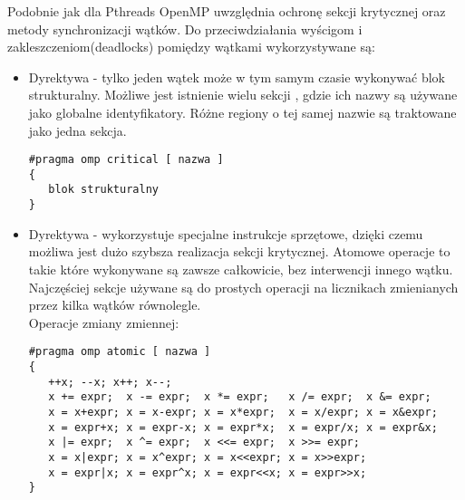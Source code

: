\documentclass[document.tex]{subfiles}
\begin{document}
\indent Podobnie jak dla Pthreads OpenMP uwzględnia ochronę sekcji krytycznej 
oraz metody synchronizacji wątków. Do przeciwdziałania wyścigom i zakleszczeniom(deadlocks) pomiędzy wątkami wykorzystywane są:\cite{openmp_spec}\cite{openmp_guide}
\begin{itemize}
\item Dyrektywa  - tylko jeden wątek może w tym samym czasie wykonywać blok strukturalny. Możliwe jest istnienie wielu sekcji , gdzie ich nazwy 
są używane jako globalne identyfikatory. Różne regiony  o tej samej
nazwie są traktowane jako jedna sekcja.\cite{openmp_pacheco}\cite{openmp_blaise} 
\begin{verbatim}
#pragma omp critical [ nazwa ]
{
   blok strukturalny
}
\end{verbatim}

\item Dyrektywa  - wykorzystuje specjalne instrukcje sprzętowe, dzięki
czemu możliwa jest dużo szybsza realizacja sekcji krytycznej. Atomowe operacje to
takie które wykonywane są zawsze całkowicie, bez interwencji innego wątku.
Najczęściej sekcje  używane są do prostych operacji na licznikach
zmienianych przez kilka wątków równolegle.\cite{openmp_guide}\cite{openmp_spec}
\\
Operacje zmiany zmiennej:
\begin{verbatim}
#pragma omp atomic [ nazwa ]
{
   ++x; --x; x++; x--;
   x += expr;  x -= expr;  x *= expr;   x /= expr;  x &= expr;
   x = x+expr; x = x-expr; x = x*expr;  x = x/expr; x = x&expr;
   x = expr+x; x = expr-x; x = expr*x;  x = expr/x; x = expr&x;
   x |= expr;  x ^= expr;  x <<= expr;  x >>= expr;
   x = x|expr; x = x^expr; x = x<<expr; x = x>>expr;
   x = expr|x; x = expr^x; x = expr<<x; x = expr>>x;
}
\end{verbatim}


\end{itemize}
\end{document}
